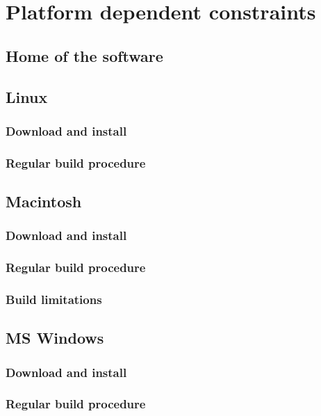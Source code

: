 \chapter{Platform dependent constraints}

\section{Home of the software}

\section{Linux}

\subsection{Download and install}

\subsection{Regular build procedure}

\section{Macintosh}

\subsection{Download and install}

\subsection{Regular build procedure}

\subsection{Build limitations}

\section{MS Windows}

\subsection{Download and install}

\subsection{Regular build procedure}

